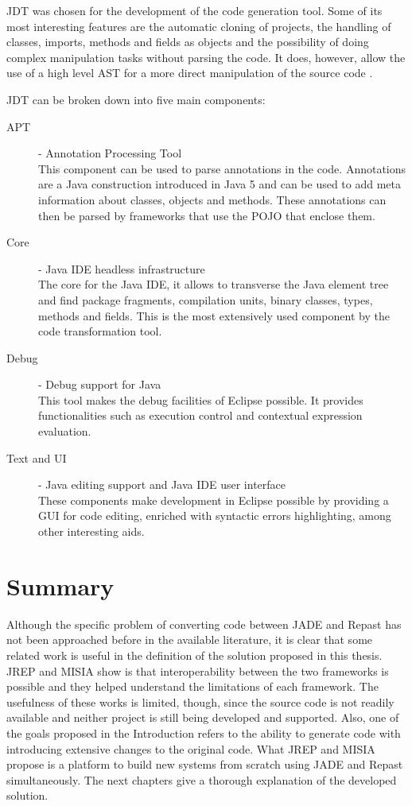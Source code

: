 	JDT was chosen for the development of the code generation tool. Some of its most interesting features are the automatic cloning of projects, the handling of classes, imports, methods and fields as objects and the possibility of doing complex manipulation tasks without parsing the code. It does, however, allow the use of a high level AST for a more direct manipulation of the source code \cite{eclipseJDT}.

	JDT can be broken down into five main components: 

	\begin{description}
		\item[APT] - Annotation Processing Tool\hfill \\
  			This component can be used to parse annotations in the code. Annotations are a Java construction introduced in Java 5 and can be used to add meta information about classes, objects and methods. These annotations can then be parsed by frameworks that use the POJO that enclose them.
		\item[Core] - Java IDE headless infrastructure \hfill \\
  			The core for the Java IDE, it allows to transverse the Java element tree and find package fragments, compilation units, binary classes, types, methods and fields. This is the most extensively used component by the code transformation tool.
		\item[Debug] - Debug support for Java\hfill \\
  			This tool makes the debug facilities of Eclipse possible. It provides functionalities such as execution control and contextual expression evaluation.
		\item[Text and UI] - Java editing support and Java IDE user interface \hfill \\
  			These components make development in Eclipse possible by providing a GUI for code editing, enriched with syntactic errors highlighting, among other interesting aids.
	\end{description}

\section{Summary}
Although the specific problem of converting code between JADE and Repast has not been approached before in the available literature, it is clear that some related work is useful in the definition of the solution proposed in this thesis. JREP and MISIA show is that interoperability between the two frameworks is possible and they helped understand the limitations of each framework. The usefulness of these works is limited, though, since the source code is not readily available and neither project is still being developed and supported. Also, one of the goals proposed in the Introduction refers to the ability to generate code with introducing extensive changes to the original code. What JREP and MISIA propose is a platform to build new systems from scratch using JADE and Repast simultaneously. The next chapters give a thorough explanation of the developed solution.